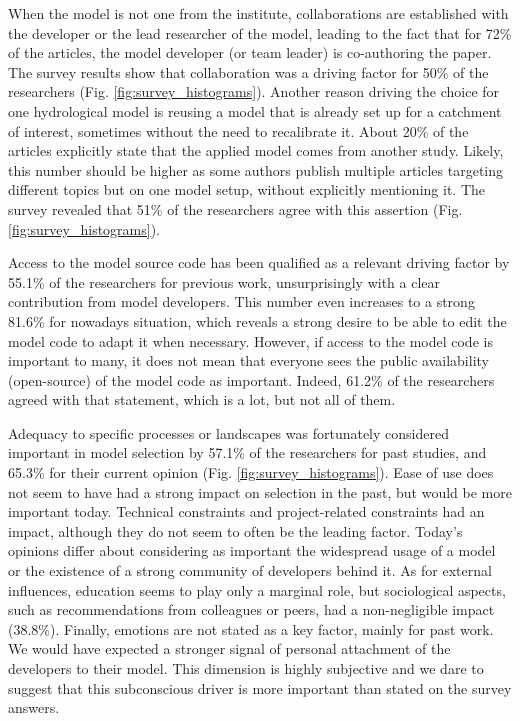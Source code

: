 \documentclass[10pt,a4paper]{article}
\begin{document}
When the model is not one from the institute, collaborations are established with the developer or the lead researcher of the model, leading to the fact that for 72\% of the articles, the model developer (or team leader) is co-authoring the paper. The survey results show that collaboration was a driving factor for 50\% of the researchers (Fig. \ref{fig:survey_histograms}). Another reason driving the choice for one hydrological model is reusing a model that is already set up for a catchment of interest, sometimes without the need to recalibrate it. About 20\% of the articles explicitly state that the applied model comes from another study. Likely, this number should be higher as some authors publish multiple articles targeting different topics but on one model setup, without explicitly mentioning it. The survey revealed that 51\% of the researchers agree with this assertion (Fig. \ref{fig:survey_histograms}).

Access to the model source code has been qualified as a relevant driving factor by 55.1\% of the researchers for previous work, unsurprisingly with a clear contribution from model developers. This number even increases to a strong 81.6\% for nowadays situation, which reveals a strong desire to be able to edit the model code to adapt it when necessary. However, if access to the model code is important to many, it does not mean that everyone sees the public availability (open-source) of the model code as important. Indeed, 61.2\% of the researchers agreed with that statement, which is a lot, but not all of them.

Adequacy to specific processes or landscapes was fortunately considered important in model selection by 57.1\% of the researchers for past studies, and 65.3\% for their current opinion (Fig. \ref{fig:survey_histograms}). Ease of use does not seem to have had a strong impact on selection in the past, but would be more important today. Technical constraints and project-related constraints had an impact, although they do not seem to often be the leading factor. Today's opinions differ about considering as important the widespread usage of a model or the existence of a strong community of developers behind it. As for external influences, education seems to play only a marginal role, but sociological aspects, such as recommendations from colleagues or peers, had a non-negligible impact (38.8\%). Finally, emotions are not stated as a key factor, mainly for past work. We would have expected a stronger signal of personal attachment of the developers to their model. This dimension is highly subjective and we dare to suggest that this subconscious driver is more important than stated on the survey answers.
\end{document}

